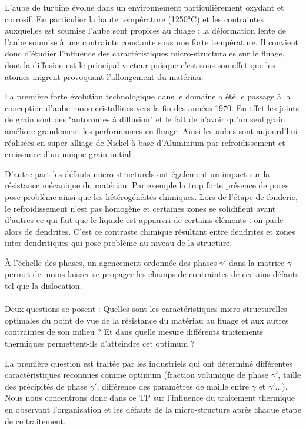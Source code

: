 L'aube de turbine évolue dans un environnement particulièrement oxydant et corrosif. En particulier la haute température (1250°C) et les contraintes auxquelles est soumise l'aube sont propices au fluage : la déformation lente de l'aube soumise à une contrainte constante sous une forte température. Il convient donc d'étudier l'influence des caractéristiques micro-structurales sur le fluage, dont la diffusion est le principal vecteur puisque c'est sous son effet que les atomes migrent provoquant l'allongement du matériau.

La première forte évolution technologique dans le domaine a été le passage à la conception d'aube mono-cristallines vers la fin des années 1970. En effet les joints de grain sont des "autoroutes à diffusion" et le fait de n'avoir qu'un seul grain améliore grandement les performances en fluage. Ainsi les aubes sont aujourd'hui réalisées en super-alliage de Nickel à base d'Aluminium par refroidissement et croissance d'un unique grain initial.

D'autre part les défauts micro-structurels ont également un impact sur la résistance mécanique du matériau. Par exemple la trop forte présence de pores pose problème ainsi que les hétérogénéités chimiques. Lors de l'étape de fonderie, le refroidissement n'est pas homogène et certaines zones se solidifient avant d'autres ce qui fait que le liquide est appauvri de certains éléments : on parle alors de dendrites. C'est ce contraste chimique résultant entre dendrites et zones inter-dendritiques qui pose problème au niveau de la structure.

À l'échelle des phases, un agencement ordonnée des phases $\gamma'$ dans la matrice $\gamma$ permet de moins laisser se propager les champs de contraintes de certains défauts tel que la dislocation.
\\
\\

Deux questions se posent : Quelles sont les caractéristiques micro-structurelles optimales du point de vue de la résistance du matériau au fluage et aux autres contraintes de son milieu ? Et dans quelle mesure différents traitements thermiques permettent-ils d'atteindre cet optimum ?

La première question est traitée par les industriels qui ont déterminé différentes caractéristiques reconnues comme optimum (fraction volumique de phase $\gamma'$, taille des précipités de phase $\gamma'$, différence des paramètres de maille entre $\gamma$ et $\gamma'$...).
Nous nous concentrons donc dans ce TP sur l'influence du traitement thermique en observant l'organisation et les défauts de la micro-structure après chaque étape de ce traitement.

\newpage